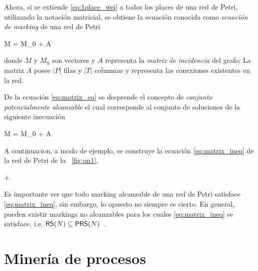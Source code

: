 Ahora, si se extiende \eqref{eq:1place_wei} a todos los places de una red de Petri,
utilizando la notación matricial, se obtiene la ecuación conocida como 
\emph{ecuación de marking} de una red de Petri~\cite{Murata89}

    M = M_0 + A \cdot \widehat\sigma 
\eequation

donde $M$ y $M_0$ son vectores y $A$ representa la \emph{matriz de incidencia}
del grafo; La matriz $A$ posee $|P|$ filas y $|T|$ columnas y representa las conexiones 
existentes en la red.

De la ecuación \autoref{eq:matrix_eq} se desprende el concepto
de \textit{conjunto potencialmente alcanzable} el cual corresponde al conjunto
de soluciones de la siguiente inecuación

    M = M_0 + A \cdot \widehat\sigma {}
\eequation


A continuacion, a modo de ejemplo, se construye la ecuación \eqref{eq:matrix_ineq} de
la red de Petri de la ~\autoref{fig:pn1}, 

\bequation
    \left[\begin{array}{c} 1 \\ 6 \end{array} \right] +
    \left[\begin{array}{rr} 1 & -1 \\ -2 & 3 \end{array} \right]
    \cdot
    \geq 
    \left[\begin{array}{c} 0 \\ 0 \end{array} \right]
\eequation

Es importante ver que todo marking alcanzable de una red de Petri
satisface \eqref{eq:matrix_ineq}, sin embargo, lo opuesto no siempre es cierto.
En general, pueden existir markings no alcanzables para
los cuales \eqref{eq:matrix_ineq} se satisface, i.e. $\textsf{RS}(N) \subseteq \textsf{PRS}(N)$~\cite{SilvaTC96}.

\section{Minería de procesos} 
\label{sec:2.process mining}

